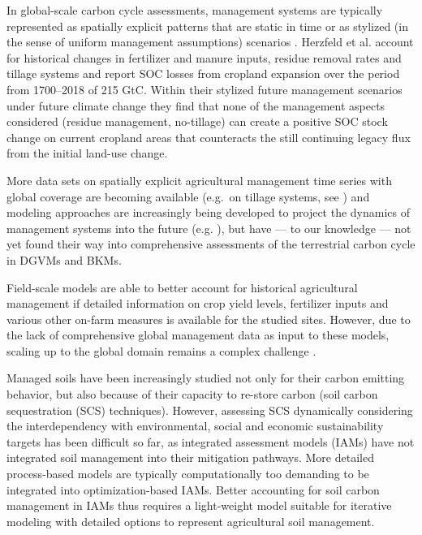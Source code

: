 \documentclass[gc, manuscript]{copernicus}
\begin{document}
In global-scale carbon cycle assessments, management systems are typically represented as spatially explicit patterns that are static in time \citetext{\citealp[e.g.~for growing seasons in][]{portmann_mirca2000global_2010}; \citealp[multiple cropping systems in][]{waha_multiple_2020}; \citealp[irrigation systems in][]{jagermeyr_water_2015}} or as stylized (in the sense of uniform management assumptions) scenarios \citep[e.g.][]{pugh_simulated_2015, lutz_simulating_2019}. Herzfeld et al. \citeyearpar{herzfeld_soc_2021} account for historical changes in fertilizer and manure inputs, residue removal rates and tillage systems and report SOC losses from cropland expansion over the period from 1700--2018 of 215 GtC. Within their stylized future management scenarios under future climate change they find that none of the management aspects considered (residue management, no-tillage) can create a positive SOC stock change on current cropland areas that counteracts the still continuing legacy flux from the initial land-use change.

More data sets on spatially explicit agricultural management time series with global coverage are becoming available (e.g.~on tillage systems, see \citep{porwollik_generating_2019, prestele_spatially_2018}) and modeling approaches are increasingly being developed to project the dynamics of management systems into the future (e.g. \citep{iizumi_modeling_2019, minoli_modelling_2019}), but have --- to our knowledge --- not yet found their way into comprehensive assessments of the terrestrial carbon cycle in DGVMs and BKMs.

Field-scale models \citep{del_grosso_simulated_2001, coleman_simulating_1997, smith_estimating_2010, taghizadeh-toosi_c-tool_2014} are able to better account for historical agricultural management if detailed information on crop yield levels, fertilizer inputs and various other on-farm measures is available for the studied sites. However, due to the lack of comprehensive global management data as input to these models, scaling up to the global domain remains a complex challenge \citep{morais_detailed_2019}.

Managed soils have been increasingly studied not only for their carbon emitting behavior, but also because of their capacity to re-store carbon (soil carbon sequestration (SCS) techniques). However, assessing SCS dynamically considering the interdependency with environmental, social and economic sustainability targets has been difficult so far, as integrated assessment models (IAMs) \citep{popp_land-use_2016, rogelj_scenarios_2018, forster_sr1p5_2018} have not integrated soil management into their mitigation pathways. More detailed process-based models are typically computationally too demanding to be integrated into optimization-based IAMs. Better accounting for soil carbon management in IAMs thus requires a light-weight model suitable for iterative modeling with detailed options to represent agricultural soil management.
\end{document}
